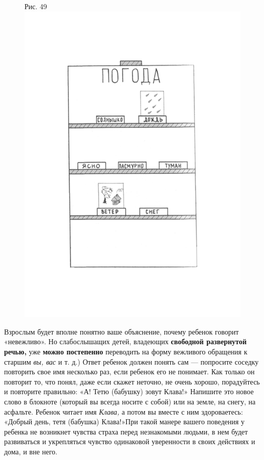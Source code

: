 \documentclass[a5paper]{book}
\renewcommand{\emph}[1]{\textit{#1}}
\begin{document}
\begin{figure}
\centering
Рис. 49 \includegraphics[width=\linewidth]{media/media/image45.png}
\end{figure}

Взрослым будет вполне понятно ваше объяснение, почему ребенок говорит
«невежливо». Но слабослышащих детей, владеющих \textbf{свободной
развернутой речью,} уже \textbf{можно постепенно} переводить на форму
вежливого обращения к старшим \emph{вы, вас} и т. д.) Ответ ребенок
должен понять сам --- попросите соседку повторить свое имя несколько
раз, если ребенок его не понимает. Как только он повторит то, что понял,
даже если скажет неточно, не очень хорошо, порадуйтесь и повторите
правильно: «А! Тетю (бабушку) зовут Клава!» Напишите это новое слово в
блокноте (который вы всегда носите с собой) или на земле, на снегу, на
асфальте. Ребенок читает имя \emph{Клава,} а потом вы вместе с ним
здороваетесь: «Добрый день, тетя (бабушка) Клава!»При такой манере
вашего поведения у ребенка не возникнет чувства страха перед незнакомыми
людьми, в нем будет развиваться и укрепляться чувство одинаковой
уверенности в своих действиях и дома, и вне него.
\end{document}

